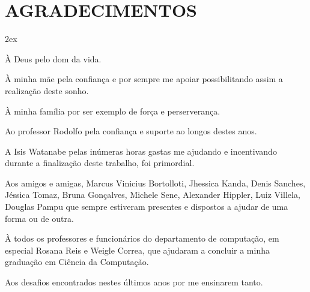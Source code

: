 \chapter*{AGRADECIMENTOS}
\begin{trivlist}  \itemsep 2ex  \normalsize
	\item \`{A} Deus pelo dom da vida.
        \item \`{A} minha m\~{a}e pela confian\c{c}a e por sempre me apoiar possibilitando assim a realiza\c{c}\~ao deste sonho.
        \item \`{A} minha fam\'{i}lia por ser exemplo de for\c{c}a e perserveran\c{c}a.
        \item Ao professor Rodolfo pela confian\c{c}a e suporte ao longos destes anos.
        \item A Isis Watanabe pelas in\'{u}meras horas gastas me ajudando e incentivando durante a finaliza\c{c}\~{a}o deste trabalho, foi primordial.
	\item Aos amigos e amigas, Marcus Vinicius Bortolloti, Jhessica Kanda, Denis Sanches, J\'{e}ssica Tomaz, Bruna Gon\c{c}alves, Michele Sene, 
	      Alexander Hippler, Luiz Villela, Douglas Pampu que sempre estiveram presentes e dispostos a ajudar de uma forma ou de outra.
        \item \`{A} todos os professores e funcion\'{a}rios do departamento de computa\c{c}\~{a}o, em especial Rosana Reis e Weigle Correa, que ajudaram a 
		concluir a minha gradua\c{c}\~ao em Ci\^{e}ncia da Computa\c{c}\~{a}o.
	\item Aos desafios encontrados nestes \'{u}ltimos anos por me ensinarem tanto.
\end{trivlist}
